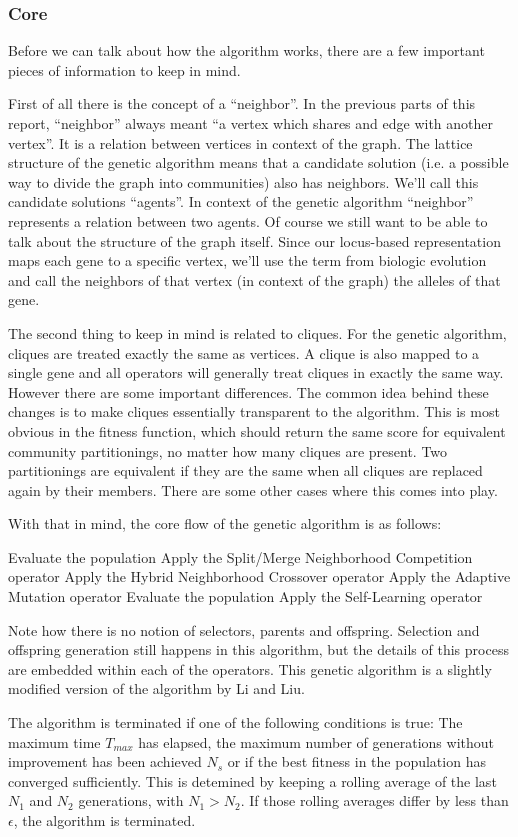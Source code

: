 \subsubsection{Core}
Before we can talk about how the algorithm works, there are a few important pieces of information to keep in mind. 
\par
First of all there is the concept of a ``neighbor''. In the previous parts of this report, ``neighbor'' always meant ``a vertex which shares and edge with another vertex''. It is a relation between vertices in context of the graph. The lattice structure of the genetic algorithm means that a candidate solution (i.e. a possible way to divide the graph into communities) also has neighbors. We'll call this candidate solutions ``agents''. In context of the genetic algorithm ``neighbor'' represents a relation between two agents. Of course we still want to be able to talk about the structure of the graph itself. Since our locus-based representation maps each gene to a specific vertex, we'll use the term from biologic evolution and call the neighbors of that vertex (in context of the graph) the alleles of that gene.
\par
The second thing to keep in mind is related to cliques. For the genetic algorithm, cliques are treated exactly the same as vertices. A clique is also mapped to a single gene and all operators will generally treat cliques in exactly the same way. However there are some important differences. The common idea behind these changes is to make cliques essentially transparent to the algorithm. This is most obvious in the fitness function, which should return the same score for equivalent community partitionings, no matter how many cliques are present. Two partitionings are equivalent if they are the same when all cliques are replaced again by their members. There are some other cases where this comes into play.
\par
With that in mind, the core flow of the genetic algorithm is as follows:
\begin{algorithmic}[1]
\STATE Evaluate the population
\STATE Apply the Split/Merge Neighborhood Competition operator
\STATE Apply the Hybrid Neighborhood Crossover operator
\STATE Apply the Adaptive Mutation operator
\STATE Evaluate the population
\STATE Apply the Self-Learning operator
\end{algorithmic}
Note how there is no notion of selectors, parents and offspring. Selection and offspring generation still happens in this algorithm, but the details of this process are embedded within each of the operators. This genetic algorithm is a slightly modified version of the algorithm by Li and Liu\cite{Li2016}.
\par
The algorithm is terminated if one of the following conditions is true: The maximum time $T_{max}$ has elapsed, the maximum number of generations without improvement has been achieved $N_{s}$ or if the best fitness in the population has converged sufficiently. This is detemined by keeping a rolling average of the last $N_1$ and $N_2$ generations, with $N_1 > N_2$. If those rolling averages differ by less than $\epsilon$, the algorithm is terminated.  
